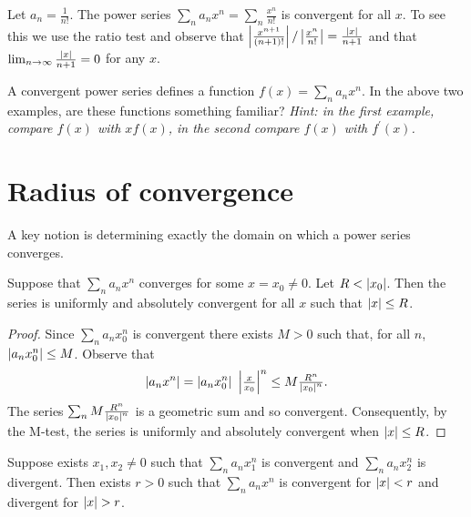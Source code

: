 \begin{example*}
  Let \(a_n = \frac{1}{n!}\).
  The power series \(\sum_{n} a_n x^n = \sum_{n}\frac{x^n}{n!}\) is convergent for all \(x\).
  To see this we use the ratio test and observe that  \(\left|\frac{x^{n+1}}{(n+1)!} \right|/ \left|\frac{x^n}{n!}\right| = \frac{\left|x\right|}{n+1}\) and that \(\lim_{n\to\infty} \frac{\left|x\right|}{n+1} = 0 \) for any \(x\).
\end{example*}

\begin{example*}
  A convergent power series defines a function \(f(x) = \sum_{n} a_n x^n\).
  In the above two examples, are these functions something familiar? \emph{Hint: in the first example, compare \(f(x)\) with \(x f(x)\), in the second compare \(f(x)\) with \(f^{\prime}(x)\).}
\end{example*}

\section{Radius of convergence}

A key notion is determining exactly the domain on which a power series converges.

\begin{theorem}
  Suppose that \(\sum_{n}a_n x^n\) converges for some \(x=x_0 \neq 0\).
  Let \(R<\left|x_0\right|\).
  Then the series is uniformly and absolutely convergent for all \(x\) such that \(\left|x\right|\leq R\).
\end{theorem}

\begin{proof}
  Since \(\sum_n a_n x_0^n\) is convergent there exists  \(M>0\) such that, for all \(n\), \(\left|a_n x_0^n\right| \leq M\).
  Observe that
  \[
    \abs{a_n x^n} = \abs{a_n x_0^n} \ \abs{\tfrac{x}{x_0}}^n \leq M \tfrac{R^n}{\abs{x_0}^n}.
  \]
  The series
  \(\sum_n M \frac{R^n}{\left|x_0\right|^n}\) is a geometric sum and so convergent.
  Consequently, by the M-test, the series is uniformly and absolutely convergent when \(\left|x\right|\leq R\).
\end{proof}

\begin{theorem}%
  \label{thm:radius-of-convergence}
  Suppose exists  \(x_1,x_2 \neq 0\) such that \(\sum_n a_n x_1^n\) is convergent and \(\sum_n a_n x_2^n\) is divergent.
  Then exists \(r>0\) such that \(\sum_n a_n x^n\) is convergent for \(\left|x\right|<r\) and divergent for \(\abs{x}>r\).
\end{theorem}

